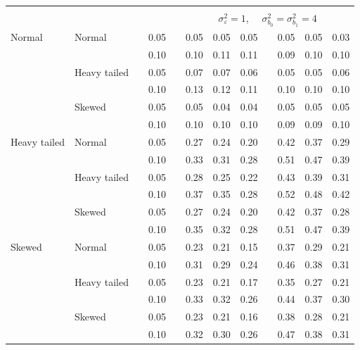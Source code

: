 \documentclass[12pt]{article} %
\begin{document}
\begin{table}[ht]
\begin{scriptsize}
\begin{center}
\begin{tabular}{ll p{.1cm} c p{.1cm} rrr p{.1cm} rrr}
&&&&&&&&&&&\\
& && && \multicolumn{7}{c}{$\sigma_{\varepsilon}^2 = 1$, \ \ $\sigma_{b_0}^2 = \sigma_{b_1}^2 = 4$} \\ \cline{6-12}
Normal       & Normal       && 0.05 &&   0.05 & 0.05 & 0.05 && 0.05 & 0.05 & 0.03 \\ 
             &              && 0.10 &&   0.10 & 0.11 & 0.11 && 0.09 & 0.10 & 0.10 \\ 
             & Heavy tailed && 0.05 &&   0.07 & 0.07 & 0.06 && 0.05 & 0.05 & 0.06 \\ 
             &              && 0.10 &&   0.13 & 0.12 & 0.11 && 0.10 & 0.10 & 0.10 \\ 
             & Skewed       && 0.05 &&   0.05 & 0.04 & 0.04 && 0.05 & 0.05 & 0.05 \\ 
             &              && 0.10 &&   0.10 & 0.10 & 0.10 && 0.09 & 0.09 & 0.10 \\ 
Heavy tailed & Normal       && 0.05 &&   0.27 & 0.24 & 0.20 && 0.42 & 0.37 & 0.29 \\ 
             &              && 0.10 &&   0.33 & 0.31 & 0.28 && 0.51 & 0.47 & 0.39 \\ 
             & Heavy tailed && 0.05 &&   0.28 & 0.25 & 0.22 && 0.43 & 0.39 & 0.31 \\ 
             &              && 0.10 &&   0.37 & 0.35 & 0.28 && 0.52 & 0.48 & 0.42 \\ 
             & Skewed       && 0.05 &&   0.27 & 0.24 & 0.20 && 0.42 & 0.37 & 0.28 \\ 
             &              && 0.10 &&   0.35 & 0.32 & 0.28 && 0.51 & 0.47 & 0.39 \\ 
Skewed       & Normal       && 0.05 &&   0.23 & 0.21 & 0.15 && 0.37 & 0.29 & 0.21 \\ 
             &              && 0.10 &&   0.31 & 0.29 & 0.24 && 0.46 & 0.38 & 0.31 \\ 
             & Heavy tailed && 0.05 &&   0.23 & 0.21 & 0.17 && 0.35 & 0.27 & 0.21 \\ 
             &              && 0.10 &&   0.33 & 0.32 & 0.26 && 0.44 & 0.37 & 0.30 \\ 
             & Skewed       && 0.05 &&   0.23 & 0.21 & 0.16 && 0.38 & 0.28 & 0.21 \\ 
             &              && 0.10 &&   0.32 & 0.30 & 0.26 && 0.47 & 0.38 & 0.31 \\ 

\hline
\end{tabular}
\end{center}
\end{scriptsize}
\end{table}
\end{document}

